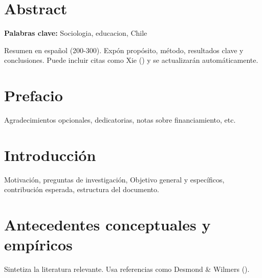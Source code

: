 \documentclass[
  spanish,
  a4paper,
  oneside]{scrbook}
\begin{document}
\frontmatter
\pagestyle{scrheadings}

\setcounter{tocdepth}{2} %
\tableofcontents
\cleardoublepage
\listoffigures
\cleardoublepage
\listoftables
\cleardoublepage


\mainmatter
{}

\chapter*{Abstract}\label{abstract}


\small\textbf{Palabras clave:} Sociologia, educacion, Chile \normalsize

Resumen en español (200-300). Expón propósito, método, resultados clave
y conclusiones. Puede incluir citas como Xie
() y se actualizarán
automáticamente.


\chapter*{Prefacio}\label{prefacio}


Agradecimientos opcionales, dedicatorias, notas sobre financiamiento,
etc.

\mainmatter


\chapter{Introducción}\label{introducciuxf3n}

Motivación, preguntas de investigación, Objetivo general y específicos,
contribución esperada, estructura del documento.


\chapter{Antecedentes conceptuales y
empíricos}\label{antecedentes-conceptuales-y-empuxedricos}

Sintetiza la literatura relevante. Usa referencias como Desmond \&
Wilmers ().
\end{document}
